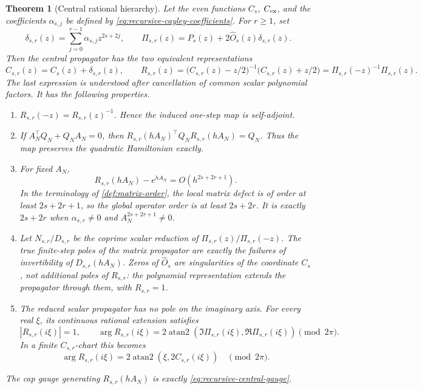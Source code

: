 \documentclass[11pt,a4paper]{article}
\newtheorem{theorem}{Theorem}[section]
\begin{document}
\begin{theorem}[Central rational hierarchy]
\label{thm:central-rational-hierarchy}
Let the even functions \(C_s\), \(C_{\rm ex}\), and the coefficients
\(\alpha_{s,j}\) be defined by
\cref{eq:recursive-cayley-coefficients}.  For \(r\ge1\), set
\begin{equation}\label{eq:central-delta-pi}
 \delta_{s,r}(z)=\sum_{j=0}^{r-1}\alpha_{s,j}z^{2s+2j},
 \qquad
 \Pi_{s,r}(z)=P_s(z)+2\widehat O_s(z)\delta_{s,r}(z).
\end{equation}
Then the central propagator has the two equivalent representations
\begin{equation}\label{eq:central-rational-family}
 C_{s,r}(z)=C_s(z)+\delta_{s,r}(z),
 \qquad
 R_{s,r}(z)=
 \bigl(C_{s,r}(z)-z/2\bigr)^{-1}
 \bigl(C_{s,r}(z)+z/2\bigr)
 =\Pi_{s,r}(-z)^{-1}\Pi_{s,r}(z).
\end{equation}
The last expression is understood after cancellation of common scalar
polynomial factors.  It has the following properties.
\begin{enumerate}
 \item \(R_{s,r}(-z)=R_{s,r}(z)^{-1}\).  Hence the induced one-step
 map is self-adjoint.
 \item If \(A_N^\top Q_N+Q_NA_N=0\), then
 \(R_{s,r}(hA_N)^\top Q_NR_{s,r}(hA_N)=Q_N\).  Thus the map preserves
 the quadratic Hamiltonian exactly.
 \item For fixed \(A_N\),
 \begin{equation}\label{eq:central-rational-order}
  R_{s,r}(hA_N)-e^{hA_N}=O(h^{2s+2r+1}).
 \end{equation}
 In the terminology of \cref{def:matrix-order}, the local matrix defect
 is of order at least \(2s+2r+1\), so the global operator order is at
 least \(2s+2r\).  It is
 exactly \(2s+2r\) when \(\alpha_{s,r}\ne0\) and
 \(A_N^{2s+2r+1}\ne0\).
 \item Let \(N_{s,r}/D_{s,r}\) be the coprime scalar reduction of
 \(\Pi_{s,r}(z)/\Pi_{s,r}(-z)\).  The true finite-step poles of the
 matrix propagator are exactly the failures of invertibility of
 \(D_{s,r}(hA_N)\).  Zeros of \(\widehat O_s\) are singularities of the
 coordinate \(C_s\), not additional poles of \(R_{s,r}\): the polynomial
 representation extends the propagator through them, with \(R_{s,r}=1\).
 \item The reduced scalar propagator has no pole on the imaginary axis.
 For every real \(\xi\), its continuous rational extension satisfies
 \begin{equation}\label{eq:central-rational-imaginary-axis}
  |R_{s,r}(i\xi)|=1,
  \qquad
  \arg R_{s,r}(i\xi)
  =2\operatorname{atan2}\!\left(
    \Im\Pi_{s,r}(i\xi),\Re\Pi_{s,r}(i\xi)
   \right)\pmod{2\pi}.
 \end{equation}
 In a finite \(C_{s,r}\)-chart this becomes
 \begin{equation}\label{eq:central-rational-phase}
  \arg R_{s,r}(i\xi)
  =2\operatorname{atan2}\!\left(\xi,2C_{s,r}(i\xi)\right)
  \quad\pmod{2\pi}.
 \end{equation}
\end{enumerate}
The cap gauge generating \(R_{s,r}(hA_N)\) is exactly
\cref{eq:recursive-central-gauge}.
\end{theorem}
\end{document}
